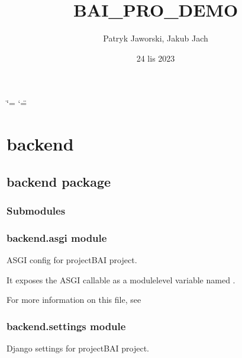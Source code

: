 \documentclass[letterpaper,11pt,polish]{sphinxmanual}
\title{BAI\_PRO\_DEMO}
\date{24 lis 2023}
\author{Patryk Jaworski, Jakub Jach}
\begin{document}
\ifdefined\shorthandoff
  \ifnum\catcode`\=\string=\active\shorthandoff{=}\fi
  \ifnum\catcode`\"=\active{}\fi
\fi

\pagestyle{empty}
\sphinxmaketitle
\pagestyle{plain}
\sphinxtableofcontents
\pagestyle{normal}
\label{\detokenize{index::doc}}


\sphinxstepscope


\chapter{backend}
\label{\detokenize{modules:backend}}\label{\detokenize{modules::doc}}
\sphinxstepscope


\section{backend package}
\label{\detokenize{backend:backend-package}}\label{\detokenize{backend::doc}}

\subsection{Submodules}
\label{\detokenize{backend:submodules}}

\subsection{backend.asgi module}
\label{\detokenize{backend:module-backend.asgi}}\label{\detokenize{backend:backend-asgi-module}}
\sphinxAtStartPar
ASGI config for projectBAI project.

\sphinxAtStartPar
It exposes the ASGI callable as a module\sphinxhyphen{}level variable named .

\sphinxAtStartPar
For more information on this file, see


\subsection{backend.settings module}
\label{\detokenize{backend:module-backend.settings}}\label{\detokenize{backend:backend-settings-module}}
\sphinxAtStartPar
Django settings for projectBAI project.
\end{document}
